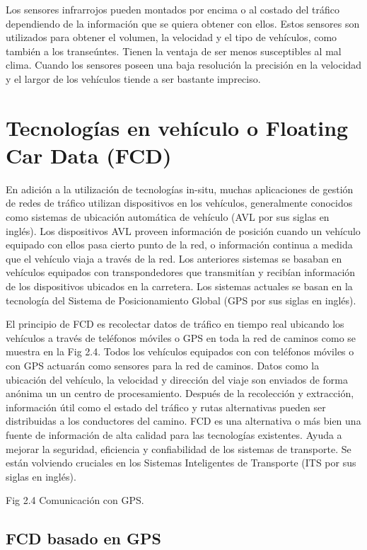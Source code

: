 \documentclass[final,fmstyle]{fpunathesis}
\begin{document}
Los sensores infrarrojos pueden montados por encima o al costado del tráfico dependiendo de la información que se quiera obtener con ellos. Estos sensores son utilizados para obtener el volumen, la velocidad y el tipo de vehículos, como también a los transeúntes. Tienen la ventaja de ser menos susceptibles al mal clima. Cuando los sensores poseen una baja resolución la precisión en la velocidad y el largor de los vehículos tiende a ser bastante impreciso.

\section{Tecnologías en vehículo o Floating Car Data (FCD)}

En adición a la utilización de tecnologías in-situ, muchas aplicaciones de gestión de redes de tráfico utilizan dispositivos en los vehículos, generalmente conocidos como sistemas de ubicación automática de vehículo (AVL por sus siglas en inglés). Los dispositivos AVL proveen información de posición cuando un vehículo equipado con ellos pasa cierto punto de la red, o información continua a medida que el vehículo viaja a través de la red. Los anteriores sistemas se basaban en vehículos equipados con transpondedores que transmitían y recibían información de los dispositivos ubicados en la carretera. Los sistemas actuales se basan en la tecnología del Sistema de Posicionamiento Global (GPS por sus siglas en inglés).

El principio de FCD es recolectar datos de tráfico en tiempo real ubicando los vehículos a través de teléfonos móviles o GPS en toda la red de caminos como se muestra en la Fig 2.4. Todos los vehículos equipados con con teléfonos móviles o con GPS actuarán como sensores para la red de caminos. Datos como la ubicación del vehículo, la velocidad y dirección del viaje son enviados de forma anónima un un centro de procesamiento. Después de la recolección y extracción, información útil como el estado del tráfico y rutas alternativas pueden ser distribuidas a los conductores del camino. FCD es una alternativa o más bien una fuente de información de alta calidad para las tecnologías existentes. Ayuda a mejorar la seguridad, eficiencia y confiabilidad de los sistemas de transporte. Se están volviendo cruciales en los Sistemas Inteligentes de Transporte (ITS por sus siglas en inglés).

Fig 2.4 Comunicación con GPS.

\subsection{FCD basado en GPS}
\end{document}
